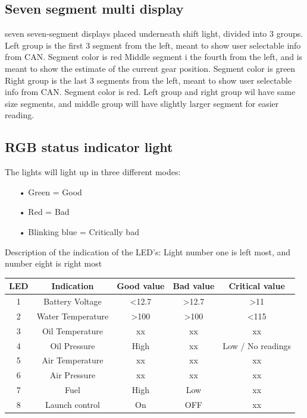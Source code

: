 \subsection*{Seven segment multi display}
seven seven-segment displays placed underneath shift light, divided into 3 groups.\newline
Left group is the first 3 segment from the left, meant to show user selectable info from CAN. Segment color is red\newline
Middle segment i the fourth from the left, and is meant to show the estimate of the current gear position. Segment color is green\newline
Right group is the last 3 segments from the left, meant to show user selectable info from CAN. Segment color is red.\newline
Left group and right group wil have same size segments, and middle group will have slightly larger segment for easier reading.

\subsection*{RGB status indicator light}
The lights will light up in three different modes:

\begin{enumerate}
	\item[•]Green = Good
	\item[•]Red = Bad
	\item[•]Blinking blue = Critically bad
\end{enumerate}
Description of the indication of the LED's:
Light number one is left most, and number eight is right most
\begin{center}
  \begin{tabular}{| c | c | c | c | c |}
    \hline
    LED & Indication & Good value & Bad value & Critical value \\ \hline
    1 & Battery Voltage & <12.7 & >12.7 & >11 \\ \hline
    2 & Water Temperature & >100 & >100 & <115  \\ \hline
    3 & Oil Temperature & xx & xx & xx \\ \hline
    4 & Oil Pressure & High & xx & Low / No readings \\ \hline
    5 & Air Temperature & xx & xx & xx \\ \hline
    6 & Air Pressure & xx & xx & xx \\ \hline
    7 & Fuel & High & Low & xx \\ \hline
    8 & Launch control & On & OFF & xx \\ \hline
  \end{tabular}
\end{center}

